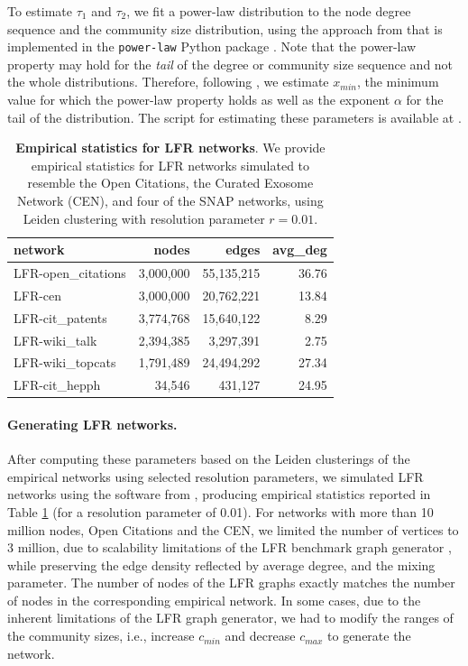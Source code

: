 \documentclass[11pt]{article}   	%
\begin{document}
To estimate $\tau_1$ and $\tau_2$, we fit a power-law distribution to the node degree sequence and the community size distribution, using the approach from \cite{clauset2009power} that is implemented in the \texttt{power-law} Python package \citep{alstott2014powerlaw}. Note that the power-law property may hold for the \textit{tail} of the degree or community size sequence and not the whole distributions. Therefore, following \cite{clauset2009power}, we estimate $x_{min}$, the minimum value for which the power-law property holds as well as the exponent $\alpha$ for the tail of the distribution. The script for estimating these parameters is available at \cite{analysis_scripts,lfr-generation-code}.

\begin{table}[ht]
\centering
\begin{tabular}{lrrr}
  \hline
 network & nodes & edges & avg\_deg \\
  \hline
    LFR-open\_citations & 3,000,000  & 55,135,215 & 36.76 \\
    LFR-cen & 3,000,000 & 20,762,221 & 13.84 \\
    LFR-cit\_patents & 3,774,768 & 15,640,122 & 8.29 \\
    LFR-wiki\_talk & 2,394,385 & 3,297,391 & 2.75 \\
    LFR-wiki\_topcats & 1,791,489 & 24,494,292 & 27.34 \\
    LFR-cit\_hepph &  34,546 & 431,127 & 24.95 \\
 \hline
\end{tabular}
\caption{\textbf{Empirical statistics for LFR networks}. We provide empirical statistics for LFR networks simulated to  resemble the Open Citations, the Curated Exosome Network (CEN), and four of the SNAP networks, using Leiden clustering with resolution parameter $r=0.01$. }
\label{tab:empirical-stats-LFR}
\end{table}

\paragraph{Generating LFR networks.}
After computing these parameters based on the Leiden clusterings of the empirical networks using selected resolution parameters, we simulated LFR networks using the software from \cite{lancichinetti2008benchmark}, producing empirical statistics reported in Table \ref{tab:empirical-stats-LFR} (for a resolution parameter of 0.01). For networks with more than 10 million nodes, Open Citations and the CEN, we limited the number of vertices to 3 million, due to scalability limitations of  the LFR benchmark graph generator \citep{slota2019scalable}, while preserving the edge density reflected by average degree, and the mixing parameter.  The number of nodes of the LFR graphs exactly matches the number of nodes in the corresponding empirical network. In some cases, due to the inherent limitations of the LFR graph generator, we had to modify the ranges of the community sizes, i.e., increase $c_{min}$ and decrease $c_{max}$ to generate the network.
\end{document}
